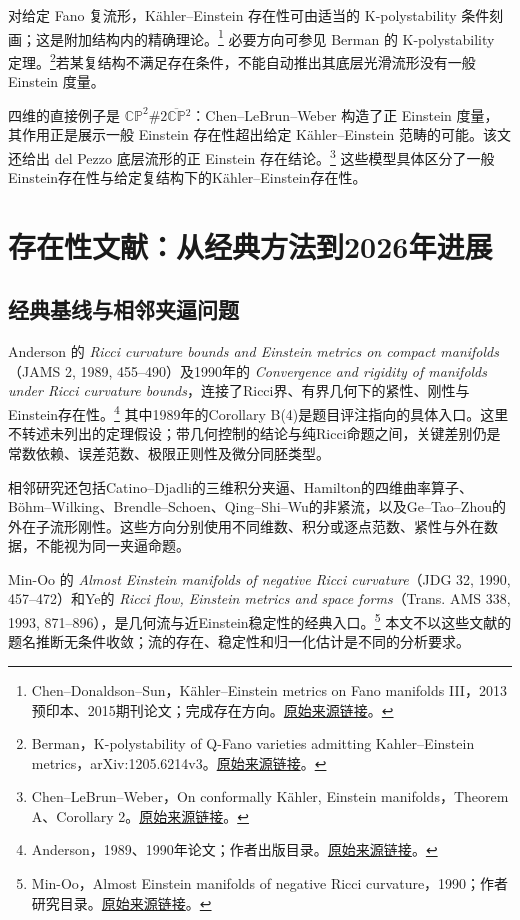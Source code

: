 \documentclass[11pt,a4paper]{article}
\theoremstyle{definition}
\newcommand{\src}[3]{\footnote{\raggedright #1，#2。\href{#3}{原始来源链接}。}}
\begin{document}
对给定 Fano 复流形，Kähler--Einstein 存在性可由适当的 K-polystability 条件刻画；这是附加结构内的精确理论。\src{Chen--Donaldson--Sun}{Kähler--Einstein metrics on Fano manifolds III，2013预印本、2015期刊论文；完成存在方向}{https://arxiv.org/abs/1302.0282}
必要方向可参见 Berman 的 K-polystability 定理。\src{Berman}{K-polystability of Q-Fano varieties admitting Kahler--Einstein metrics，arXiv:1205.6214v3}{https://arxiv.org/abs/1205.6214v3}若某复结构不满足存在条件，不能自动推出其底层光滑流形没有一般 Einstein 度量。

四维的直接例子是 $\mathbb{CP}^2\#2\overline{\mathbb{CP}}{}^2$：Chen--LeBrun--Weber 构造了正 Einstein 度量，其作用正是展示一般 Einstein 存在性超出给定 Kähler--Einstein 范畴的可能。该文还给出 del Pezzo 底层流形的正 Einstein 存在结论。\src{Chen--LeBrun--Weber}{On conformally Kähler, Einstein manifolds，Theorem A、Corollary 2}{https://arxiv.org/abs/0705.0710}
这些模型具体区分了一般Einstein存在性与给定复结构下的Kähler--Einstein存在性。

\section{存在性文献：从经典方法到2026年进展}\label{sec:existence}

\subsection{经典基线与相邻夹逼问题}

Anderson 的 \emph{Ricci curvature bounds and Einstein metrics on compact manifolds}（JAMS 2, 1989, 455--490）及1990年的 \emph{Convergence and rigidity of manifolds under Ricci curvature bounds}，连接了Ricci界、有界几何下的紧性、刚性与Einstein存在性。\src{Anderson}{1989、1990年论文；作者出版目录}{https://www.math.stonybrook.edu/~anderson/publ.pdf}
其中1989年的Corollary B(4)是题目评注指向的具体入口。这里不转述未列出的定理假设；带几何控制的结论与纯Ricci命题之间，关键差别仍是常数依赖、误差范数、极限正则性及微分同胚类型。

相邻研究还包括Catino--Djadli的三维积分夹逼、Hamilton的四维曲率算子、Böhm--Wilking、Brendle--Schoen、Qing--Shi--Wu的非紧流，以及Ge--Tao--Zhou的外在子流形刚性。这些方向分别使用不同维数、积分或逐点范数、紧性与外在数据，不能视为同一夹逼命题。

Min-Oo 的 \emph{Almost Einstein manifolds of negative Ricci curvature}（JDG 32, 1990, 457--472）和Ye的 \emph{Ricci flow, Einstein metrics and space forms}（Trans. AMS 338, 1993, 871--896），是几何流与近Einstein稳定性的经典入口。\src{Min-Oo}{Almost Einstein manifolds of negative Ricci curvature，1990；作者研究目录}{https://math.mcmaster.ca/minoo/research.html}
本文不以这些文献的题名推断无条件收敛；流的存在、稳定性和归一化估计是不同的分析要求。
\end{document}
